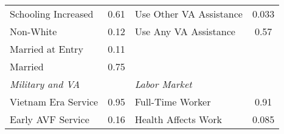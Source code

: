 \documentclass{article}
\begin{document}
\begin{table}[]
\begin{tabular}{lcclcc}
\multicolumn{2}{l}{Schooling Increased}                                          & 0.61     & \multicolumn{2}{l}{Use Other VA Assistance}                                                                                                                            & 0.033                                                               \\
\multicolumn{2}{l}{Non-White}                                                    & 0.12     & \multicolumn{2}{l}{Use Any VA Assistance}                                                                                                                              & 0.57                                                                \\
\multicolumn{2}{l}{Married at Entry}                                             & 0.11     & \multicolumn{2}{l}{}                                                                                                                                                   &                                                                     \\
\multicolumn{2}{l}{Married}                                                      & 0.75     & \multicolumn{2}{l}{}                                                                                                                                                   &                                                                     \\
\multicolumn{2}{l}{\textit{Military and VA}}                                     &          & \multicolumn{2}{l}{\textit{Labor Market}}                                                                                                                              &                                                                     \\
\multicolumn{2}{l}{Vietnam Era Service}                                          & 0.95     & \multicolumn{2}{l}{Full-Time Worker}                                                                                                                                   & 0.91                                                                \\
\multicolumn{2}{l}{Early AVF Service}                                            & 0.16     & \multicolumn{2}{l}{Health Affects Work}                                                                                                                                & 0.085                                                               \\

\end{tabular}
\end{table}
\end{document}
